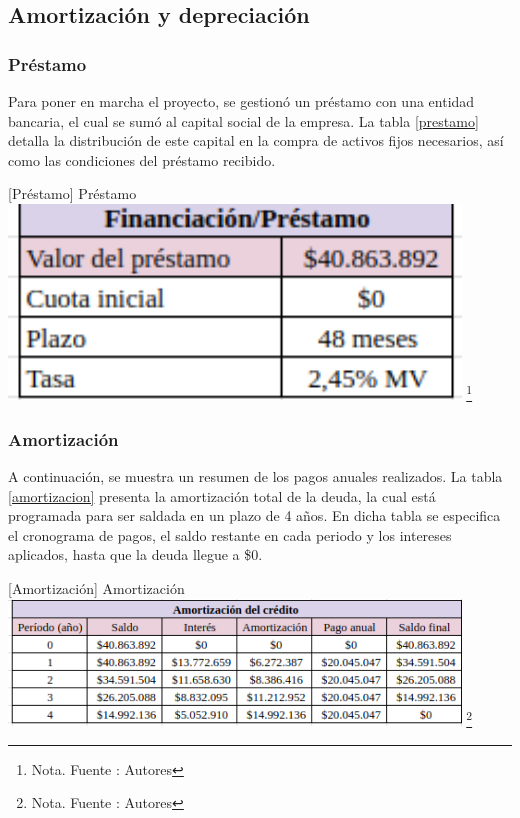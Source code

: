 \subsection{Amortización y depreciación}

\subsubsection{Préstamo}

Para poner en marcha el proyecto, se gestionó un préstamo con una entidad bancaria, el cual se sumó al capital social de la empresa. La tabla \ref{prestamo} detalla la distribución de este capital en la compra de activos fijos necesarios, así como las condiciones del préstamo recibido.

\vspace{2mm}
\begin{minipage}{0.9\textwidth}
\centering
{}[{Préstamo}]{ Préstamo }
\label{prestamo}
\includegraphics[width=0.9\textwidth]{Content/Images/AF/amortizacion_financiacion.png}
\footnote{Nota. \textup{Fuente : Autores}}
\end{minipage}

\subsubsection{Amortización}

A continuación, se muestra un resumen de los pagos anuales realizados. La tabla \ref{amortizacion} presenta la amortización total de la deuda, la cual está programada para ser saldada en un plazo de 4 años. En dicha tabla se especifica el cronograma de pagos, el saldo restante en cada periodo y los intereses aplicados, hasta que la deuda llegue a \$0.

\vspace{2mm}
\begin{minipage}{0.9\textwidth}
\centering
{}[{Amortización}]{ Amortización }
\label{amortizacion}
\includegraphics[width=0.9\textwidth]{Content/Images/AF/amortizacion_amortizacion.png}
\footnote{Nota. \textup{Fuente : Autores}}
\end{minipage}


